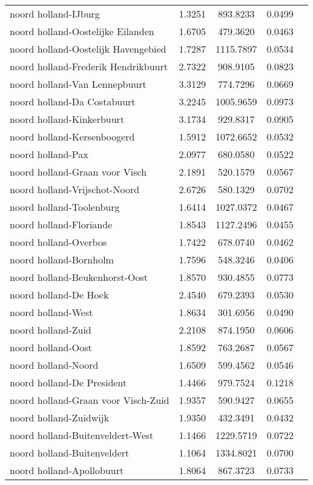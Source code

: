 \begin{longtable}{llccc}
noord holland-IJburg & 1.3251 & 893.8233 & 0.0499 \\
noord holland-Oostelijke Eilanden & 1.6705 & 479.3620 & 0.0463 \\
noord holland-Oostelijk Havengebied & 1.7287 & 1115.7897 & 0.0534 \\
noord holland-Frederik Hendrikbuurt & 2.7322 & 908.9105 & 0.0823 \\
noord holland-Van Lennepbuurt & 3.3129 & 774.7296 & 0.0669 \\
noord holland-Da Costabuurt & 3.2245 & 1005.9659 & 0.0973 \\
noord holland-Kinkerbuurt & 3.1734 & 929.8317 & 0.0905 \\
noord holland-Kersenboogerd & 1.5912 & 1072.6652 & 0.0532 \\
noord holland-Pax & 2.0977 & 680.0580 & 0.0522 \\
noord holland-Graan voor Visch & 2.1891 & 520.1579 & 0.0567 \\
noord holland-Vrijschot-Noord & 2.6726 & 580.1329 & 0.0702 \\
noord holland-Toolenburg & 1.6414 & 1027.0372 & 0.0467 \\
noord holland-Floriande & 1.8543 & 1127.2496 & 0.0455 \\
noord holland-Overbos & 1.7422 & 678.0740 & 0.0462 \\
noord holland-Bornholm & 1.7596 & 548.3246 & 0.0406 \\
noord holland-Beukenhorst-Oost & 1.8570 & 930.4855 & 0.0773 \\
noord holland-De Hoek & 2.4540 & 679.2393 & 0.0530 \\
noord holland-West & 1.8634 & 301.6956 & 0.0490 \\
noord holland-Zuid & 2.2108 & 874.1950 & 0.0606 \\
noord holland-Oost & 1.8592 & 763.2687 & 0.0567 \\
noord holland-Noord & 1.6509 & 599.4562 & 0.0546 \\
noord holland-De President & 1.4466 & 979.7524 & 0.1218 \\
noord holland-Graan voor Visch-Zuid & 1.9357 & 590.9427 & 0.0655 \\
noord holland-Zuidwijk & 1.9350 & 432.3491 & 0.0432 \\
noord holland-Buitenveldert-West & 1.1466 & 1229.5719 & 0.0722 \\
noord holland-Buitenveldert & 1.1064 & 1334.8021 & 0.0700 \\
noord holland-Apollobuurt & 1.8064 & 867.3723 & 0.0733 \\

\end{longtable}
